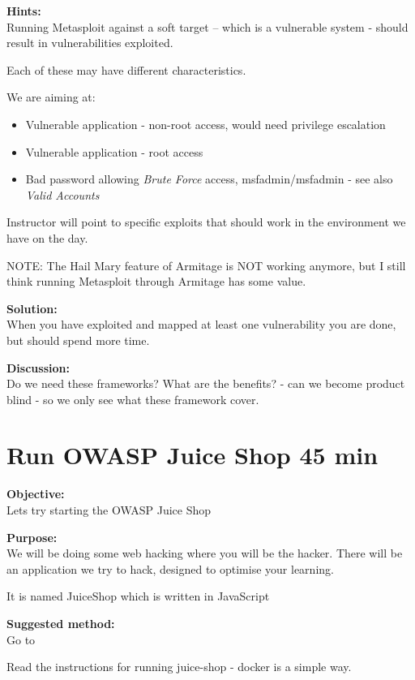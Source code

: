 \documentclass[a4paper,11pt,notitlepage]{report}
\begin{document}
{\bf Hints:}\\
Running Metasploit against a soft target -- which is a vulnerable system - should result in vulnerabilities exploited.

Each of these may have different characteristics.

We are aiming at:
\begin{itemize}
\item Vulnerable application - non-root access, would need privilege escalation
\item Vulnerable application - root access
\item Bad password allowing \emph{Brute Force} access, msfadmin/msfadmin - see also \emph{Valid Accounts}
\end{itemize}

Instructor will point to specific exploits that should work in the environment we have on the day.

NOTE: The Hail Mary feature of Armitage is NOT working anymore, but I still think running Metasploit through Armitage has some value.

{\bf Solution:}\\
When you have exploited and mapped at least one vulnerability you are done, but should spend more time.

{\bf Discussion:}\\
Do we need these frameworks? What are the benefits? - can we become product blind - so we only see what these framework cover.




\chapter{Run OWASP Juice Shop 45 min}
\label{ex:sw-startjuice}


{\bf Objective:}\\
Lets try starting the OWASP Juice Shop

{\bf Purpose:}\\
We will be doing some web hacking where you will be the hacker. There
will be an application we try to hack, designed to
optimise your learning.

It is named JuiceShop which is written in JavaScript

{\bf Suggested method:}\\
Go to 

Read the instructions for running juice-shop - docker is a simple way.
\end{document}

